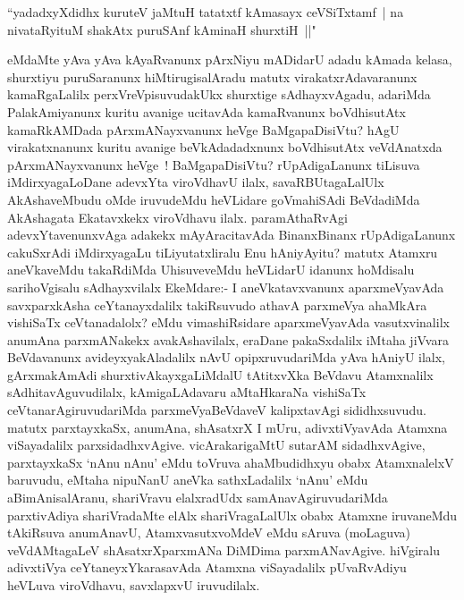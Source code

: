 \begin{shl}
``yadadxyXdidhx kuruteV jaMtuH tatatxtf kAmasayx ceVSiTxtamf~|
na nivataRyituM shakAtx puruSAnf kAminaH shurxtiH~||"
\end{shl}

\begin{artha}
eMdaMte yAva yAva kAyaRvanunx pArxNiyu mADidarU adadu  kAmada kelasa,
shurxtiyu puruSaranunx hiMtirugisalAradu matutx virakatxrAdavaranunx
kamaRgaLalilx perxVreVpisuvudakUkx shurxtige sAdhayxvAgadu, adariMda
PalakAmiyanunx kuritu avanige ucitavAda kamaRvanunx boVdhisutAtx
kamaRkAMDada pArxmANayxvanunx heVge BaMgapaDisiVtu? hAgU virakatxnanunx
kuritu avanige beVkAdadadxnunx boVdhisutAtx veVdAnatxda pArxmANayxvanunx
heVge~! BaMgapaDisiVtu? rUpAdigaLanunx tiLisuva iMdirxyagaLoDane
adevxYta viroVdhavU ilalx, savaRBUtagaLalUlx AkAshaveMbudu
oMde iruvudeMdu heVLidare goVmahiSAdi BeVdadiMda AkAshagata Ekatavxkekx
viroVdhavu ilalx. paramAthaRvAgi adevxYtavenunxvAga adakekx
mAyAracitavAda BinanxBinanx rUpAdigaLanunx cakuSxrAdi iMdirxyagaLu
tiLiyutatxliralu Enu hAniyAyitu? matutx Atamxru aneVkaveMdu
takaRdiMda UhisuveveMdu heVLidarU idanunx hoMdisalu sarihoVgisalu
sAdhayxvilalx EkeMdare:- I aneVkatavxvanunx aparxmeVyavAda
savxparxkAsha ceYtanayxdalilx takiRsuvudo athavA parxmeVya ahaMkAra
vishiSaTx ceVtanadalolx? eMdu vimashiRsidare aparxmeVyavAda
vasutxvinalilx anumAna parxmANakekx avakAshavilalx, eraDane
pakaSxdalilx iMtaha jiVvara BeVdavanunx avideyxyakAladalilx nAvU
opipxruvudariMda yAva hAniyU ilalx, gArxmakAmAdi shurxtivAkayxgaLiMdalU
tAtitxvXka BeVdavu Atamxnalilx sAdhitavAguvudilalx, kAmigaLAdavaru
aMtaHkaraNa vishiSaTx ceVtanarAgiruvudariMda parxmeVyaBeVdaveV
kalipxtavAgi sididhxsuvudu.
\newpage
matutx parxtayxkaSx, anumAna, shAsatxrX I mUru, adivxtiVyavAda Atamxna
viSayadalilx parxsidadhxvAgive. vicArakarigaMtU sutarAM sidadhxvAgive,
parxtayxkaSx `nAnu nAnu' eMdu toVruva ahaMbudidhxyu obabx AtamxnalelxV
baruvudu, eMtaha nipuNanU aneVka sathxLadalilx `nAnu' eMdu
aBimAnisalAranu, shariVravu elalxradUdx samAnavAgiruvudariMda
parxtivAdiya shariVradaMte elAlx shariVragaLalUlx obabx Atamxne
iruvaneMdu tAkiRsuva anumAnavU, AtamxvasutxvoMdeV eMdu sAruva
(moLaguva) veVdAMtagaLeV shAsatxrXparxmANa DiMDima
parxmANavAgive. hiVgiralu adivxtiVya ceYtaneyxYkarasavAda Atamxna
viSayadalilx pUvaRvAdiyu heVLuva viroVdhavu, savxlapxvU iruvudilalx.
\end{artha}


